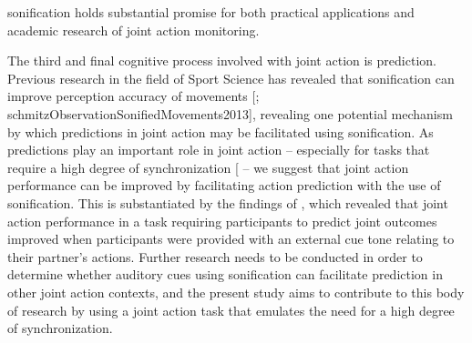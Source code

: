 \documentclass[10pt,a4paper,onecolumn]{article}
\begin{document}
sonification holds substantial promise for both practical applications and academic research of joint action monitoring.

The third and final cognitive process involved with joint action is prediction. Previous research in the field of Sport Science has revealed that sonification can improve perception accuracy of movements {[}\textcite{effenbergMovementSonificationEffects2005}; schmitzObservationSonifiedMovements2013{]}, revealing one potential mechanism by which predictions in joint action may be facilitated using sonification. As predictions play an important role in joint action \autocite{sebanzJointActionBodies2006} -- especially for tasks that require a high degree of synchronization {[}\textcite{vesperMinimalArchitectureJoint2010} -- we suggest that joint action performance can be improved by facilitating action prediction with the use of sonification. This is substantiated by the findings of \textcite{knoblichActionCoordinationGroups2003}, which revealed that joint action performance in a task requiring participants to predict joint outcomes improved when participants were provided with an external cue tone relating to their partner's actions. Further research needs to be conducted in order to determine whether auditory cues using sonification can facilitate prediction in other joint action contexts, and the present study aims to contribute to this body of research by using a joint action task that emulates the need for a high degree of synchronization.
\end{document}
